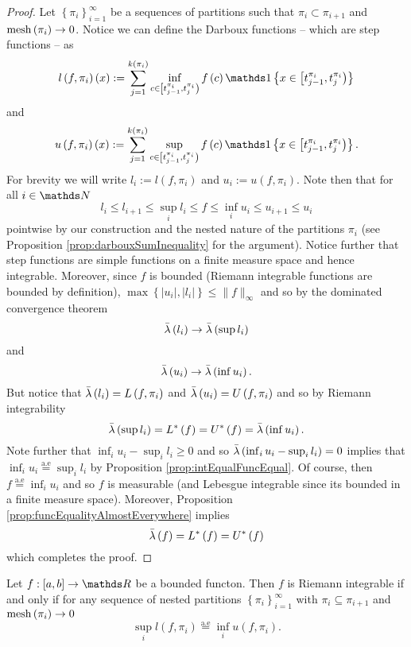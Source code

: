 \begin{proof}
Let $\left\{ \pi_{i}\right\} _{i=1}^{\infty}$ be a sequences of partitions
such that $\pi_{i}\subset\pi_{i+1}$ and $\mathrm{mesh}\left(\pi_{i}\right)\to0$.
Notice we can define the Darboux functions -- which are step functions
-- as
\[
l\left(f,\pi_{i}\right)\left(x\right):=\sum_{j=1}^{k\left(\pi_{i}\right)}\inf_{c\in\left[t_{j-1}^{\pi_{i}},t_{j}^{\pi_{i}}\right)}f\left(c\right)\indicate\left\{ x\in\left[t_{j-1}^{\pi_{i}},t_{j}^{\pi_{i}}\right)\right\} 
\]
and
\[
u\left(f,\pi_{i}\right)\left(x\right):=\sum_{j=1}^{k\left(\pi_{i}\right)}\sup_{c\in\left[t_{j-1}^{\pi_{i}},t_{j}^{\pi_{i}}\right)}f\left(c\right)\indicate\left\{ x\in\left[t_{j-1}^{\pi_{i}},t_{j}^{\pi_{i}}\right)\right\} .
\]
For brevity we will write $l_{i}:=l\left(f,\pi_{i}\right)$ and $u_{i}:=u\left(f,\pi_{i}\right)$.
Note then that for all $i\in\N$
\[
l_{i}\leq l_{i+1}\leq\sup_{i}l_{i}\leq f\leq\inf_{i}u_{i}\leq u_{i+1}\leq u_{i}
\]
pointwise by our construction and the nested nature of the partitions
$\pi_{i}$ (see Proposition \ref{prop:darbouxSumInequality} for the
argument). Notice further that step functions are simple functions
on a finite measure space and hence integrable. Moreover, since $f$
is bounded (Riemann integrable functions are bounded by definition),
$\max\left\{ \lvert u_{i}\rvert,\lvert l_{i}\rvert\right\} \leq\lVert f\rVert_{\infty}$
and so by the dominated convergence theorem
\[
\bar{\lambda}\left(l_{i}\right)\to\bar{\lambda}\left(\sup l_{i}\right)
\]
and 
\[
\bar{\lambda}\left(u_{i}\right)\to\bar{\lambda}\left(\inf u_{i}\right).
\]
But notice that $\bar{\lambda}\left(l_{i}\right)=L\left(f,\pi_{i}\right)$
and $\bar{\lambda}\left(u_{i}\right)=U\left(f,\pi_{i}\right)$ and so by Riemann
integrability
\[
\bar{\lambda}\left(\sup l_{i}\right)=L^{*}\left(f\right)=U^{*}\left(f\right)=\bar{\lambda}\left(\inf u_{i}\right).
\]
Note further that $\inf_{i}u_{i}-\sup_{i}l_{i}\geq0$ and so $\bar{\lambda}\left(\inf_{i}u_{i}-\sup_{i}l_{i}\right)=0$
implies that $\inf_{i}u_{i}\stackrel{\text{a.e}}{=}\sup_{i}l_{i}$
by Proposition \ref{prop:intEqualFuncEqual}. Of course, then $f\stackrel{\text{a.e}}{=}\inf_{i}u_{i}$
and so $f$ is measurable (and Lebesgue integrable since its bounded
in a finite measure space). Moreover, Proposition \ref{prop:funcEqualityAlmostEverywhere}
implies
\[
\bar{\lambda}\left(f\right)=L^{*}\left(f\right)=U^{*}\left(f\right)
\]
which completes the proof.
\end{proof}
\begin{cor}
\label{cor:charRiemannIntegrable}Let $f:\left[a,b\right]\to\R$ be
a bounded functon. Then $f$ is Riemann integrable if and only if
for any sequence of nested partitions $\left\{ \pi_{i}\right\} _{i=1}^{\infty}$
with $\pi_{i}\subseteq\pi_{i+1}$ and $\mathrm{mesh}\left(\pi_{i}\right)\to0$
\[
\sup_{i}l\left(f,\pi_{i}\right)\stackrel{\text{a.e}}{=}\inf_{i}u\left(f,\pi_{i}\right).
\]
\end{cor}

